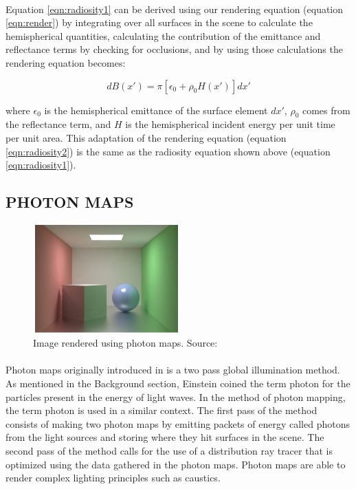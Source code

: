 \paragraph{}
Equation \ref{eqn:radiosity1} can be derived using our rendering equation (equation \ref{eqn:render}) \cite{Kajiya1986} by integrating over all surfaces in the scene to calculate the hemispherical quantities, calculating the contribution of the emittance and reflectance terms by checking for occlusions, and by using those calculations the rendering equation becomes:

\begin{equation}
dB(x') = \pi[\epsilon_{0} + \rho_{0}H(x')]dx' \label{eqn:radiosity2}
\end{equation}

where $\epsilon_{0}$ is the hemispherical emittance of the surface element $dx'$, $\rho_{0}$ comes from the reflectance term, and $H$ is the hemispherical incident energy per unit time per unit area.  This adaptation of the rendering equation (equation \ref{eqn:radiosity2}) is the same as the radiosity equation shown above (equation \ref{eqn:radiosity1}).

\subsection{PHOTON MAPS}

\begin{figure}[h!]
  \centering
    \includegraphics[width=0.5\textwidth]{photonSample.jpg}
  \caption{Image rendered using photon maps. Source: \protect\cite{Jensen1996}}
	\label{fig:photonSample}
\end{figure}

\paragraph{}
Photon maps originally introduced in \cite{Jensen1996} is a two pass global illumination method.  As mentioned in the Background section, Einstein coined the term photon for the particles present in the energy of light waves.  In the method of photon mapping, the term photon is used in a similar context.  The first pass of the method consists of making two photon maps by emitting packets of energy called photons from the light sources and storing where they hit surfaces in the scene.  The second pass of the method calls for the use of a distribution ray tracer that is optimized using the data gathered in the photon maps.  Photon maps are able to render complex lighting principles such as caustics.

